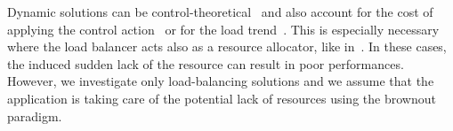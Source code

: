 Dynamic solutions can be
control-theoretical~\cite{multipathctlb,comparisonstaticdynamic} and
also account for the cost of applying the control
action~\cite{costofcontrol} or for the load trend~\cite{CasolariSA}.
This is especially necessary where the load balancer acts also as a
resource allocator, like in~\cite{Ardagnaalltogether}. In these cases,
the induced sudden lack of the resource can result in poor
performances. However, we investigate only load-balancing solutions
and we assume that the application is taking care of the potential
lack of resources using the brownout paradigm.
